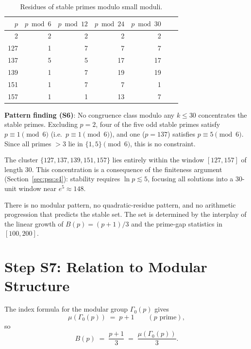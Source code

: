\documentclass[12pt,a4paper]{article}
\theoremstyle{definition}
\theoremstyle{remark}
\begin{document}
\begin{table}[h]
\centering
\caption{Residues of stable primes modulo small moduli.}
\label{tab:pss:residues}
\begin{tabular}{rrrrrrr}
\toprule
$p$ & $p \bmod 6$ & $p \bmod 12$ & $p \bmod 24$ & $p \bmod 30$ \\
\midrule
2   & 2 & 2  & 2  & 2  \\
127 & 1 & 7  & 7  & 7  \\
137 & 5 & 5  & 17 & 17 \\
139 & 1 & 7  & 19 & 19 \\
151 & 1 & 7  & 7  & 1  \\
157 & 1 & 1  & 13 & 7  \\
\bottomrule
\end{tabular}
\end{table}

\begin{infobox}
\textbf{Pattern finding (S6)}: No congruence class modulo any $k \leq 30$
concentrates the stable primes.  Excluding $p = 2$, four of the five odd stable
primes satisfy $p \equiv 1 \pmod{6}$ (i.e.\ $p \equiv 1 \pmod{6}$), and one
($p = 137$) satisfies $p \equiv 5 \pmod{6}$.  Since all primes $> 3$ lie in
$\{1, 5\} \pmod{6}$, this is no constraint.

The cluster $\{127, 137, 139, 151, 157\}$ lies entirely within the window
$[127, 157]$ of length 30.  This concentration is a consequence of the
finiteness argument (Section~\ref{sec:pss:s4}): stability requires $\ln p \lesssim 5$,
focusing all solutions into a 30-unit window near $e^5 \approx 148$.

There is no modular pattern, no quadratic-residue pattern, and no arithmetic
progression that predicts the stable set.  The set is determined by the
interplay of the linear growth of $B(p)=(p+1)/3$ and the prime-gap statistics
in $[100,200]$.
\end{infobox}

\section{Step S7: Relation to Modular Structure}
\label{sec:pss:s7}

The index formula for the modular group $\Gamma_0(p)$ gives
\[
  \mu(\Gamma_0(p)) \;=\; p + 1 \qquad(p \text{ prime}),
\]
so
\[
  B(p) \;=\; \frac{p+1}{3} \;=\; \frac{\mu(\Gamma_0(p))}{3}.
\]
\end{document}
